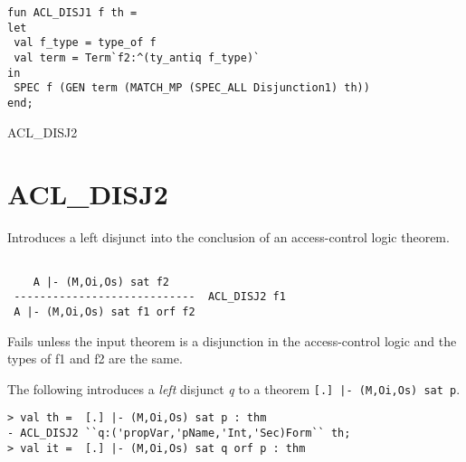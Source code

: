\IMPLEMENTATION
\begin{holboxed}
\begin{verbatim}
fun ACL_DISJ1 f th = 
let
 val f_type = type_of f
 val term = Term`f2:^(ty_antiq f_type)`
in
 SPEC f (GEN term (MATCH_MP (SPEC_ALL Disjunction1) th))
end;
\end{verbatim}
\end{holboxed}

\SEEALSO
ACL\_DISJ2
\ENDDOC

\section{ACL\_DISJ2}

  


\egroup

\SYNOPSIS
Introduces a left disjunct into the conclusion of an access-control
logic theorem.

\DESCRIBE
\begin{verbatim}

    A |- (M,Oi,Os) sat f2
 ----------------------------  ACL_DISJ2 f1
 A |- (M,Oi,Os) sat f1 orf f2
\end{verbatim}


\FAILURE
Fails unless the input theorem is a disjunction in the
access-control logic and the types of f1 and f2 are the same.

\EXAMPLE
The following introduces a \emph{left} disjunct \emph{q} to
a theorem \texttt{[.] |- (M,Oi,Os) sat p}.
\begin{holboxed}
\begin{verbatim}
> val th =  [.] |- (M,Oi,Os) sat p : thm
- ACL_DISJ2 ``q:('propVar,'pName,'Int,'Sec)Form`` th;
> val it =  [.] |- (M,Oi,Os) sat q orf p : thm
\end{verbatim}
\end{holboxed}


